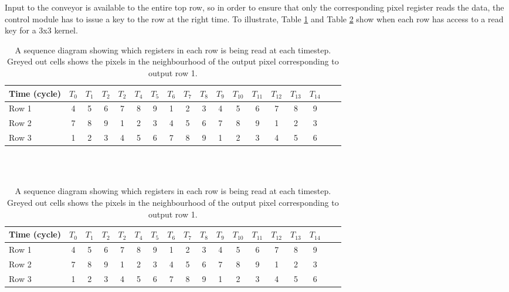 Input to the conveyor is available to the entire top row, so in order to ensure that only the corresponding pixel register reads the data, the control module has to issue a key to the row at the right time.
To illustrate, Table \ref{tbl:timing1} and Table \ref{tbl:timing2} show when each row has access to a read key for a 3x3 kernel.
\begin{table}[h]
    \begin{tabular}{l*{16}{c}r}
    Time (cycle)        & $T_{0}$ & $T_{1}$ & $T_{2}$ & $T_{2}$ & $T_{4}$  & $T_{5}$ & $T_{6}$ & $T_{7}$ & $T_{8}$ & $T_{9}$ & $T_{10}$ & $T_{11}$ & $T_{12}$ & $T_{13}$ & $T_{14}$\\
    \hline
    Row 1                   & 4 & 5 & 6 & 7 & 8 & 9 & \cellcolor{gray75} 1 & \cellcolor{gray75} 2 & \cellcolor{gray75} 3 & 4 & 5 & 6 & 7 & 8 & 9 & \\
    Row 2                   & 7 & 8 & 9 & \cellcolor{gray75} 1 & \cellcolor{gray75} 2 & \cellcolor{gray75} 3 & 4 & 5 & 6 & 7 & 8 & 9 & \cellcolor{gray75} 1 & \cellcolor{gray75} 2 & \cellcolor{gray75} 3 & \\
    Row 3                   & \cellcolor{gray75} 1 & \cellcolor{gray75} 2 & \cellcolor{gray75} 3 & 4 & 5 & 6 & 7 & 8 & 9 & \cellcolor{gray75} 1 & \cellcolor{gray75} 2 & \cellcolor{gray75} 3 & 4 & 5 & 6 & \\
    \end{tabular}
    \caption[Sequence diagram for write keys]{A sequence diagram showing which registers in each row is being read at each timestep. Greyed out cells shows the pixels in the neighbourhood of the output pixel corresponding to output row 1.}
    \label{tbl:timing1}
\end{table}
\\ \\
\begin{table}[h]
    \begin{tabular}{l*{16}{c}r}
            Time (cycle)        & $T_{0}$ & $T_{1}$ & $T_{2}$ & $T_{2}$ & $T_{4}$  & $T_{5}$ & $T_{6}$ & $T_{7}$ & $T_{8}$ & $T_{9}$ & $T_{10}$ & $T_{11}$ & $T_{12}$ & $T_{13}$ & $T_{14}$\\
        \hline
        Row 1                   & \cellcolor{gray75} 4 & 5 & 6 & 7 & 8 & 9 & 1 & \cellcolor{gray75} 2 & \cellcolor{gray75} 3 & 4\cellcolor{gray75} & 5 & 6 & 7 & 8 & 9 & \\
        Row 2                   & 7 & 8 & 9 & 1 & \cellcolor{gray75} 2 & \cellcolor{gray75} 3 & \cellcolor{gray75}4 & 5 & 6 & 7 & 8 & 9 & 1 & \cellcolor{gray75} 2 & \cellcolor{gray75} 3 & \\
        Row 3                   & 1 & \cellcolor{gray75} 2 & \cellcolor{gray75} 3 & 4\cellcolor{gray75} & 5 & 6 & 7 & 8 & 9 & 1 & \cellcolor{gray75} 2 & \cellcolor{gray75} 3 & 4\cellcolor{gray75} & 5 & 6 & \\
    \end{tabular}
    \caption[Sequence diagram for write keys, delayed one cycle]{A sequence diagram showing which registers in each row is being read at each timestep. Greyed out cells shows the pixels in the neighbourhood of the output pixel corresponding to output row 1.}
    \label{tbl:timing2}
\end{table}
